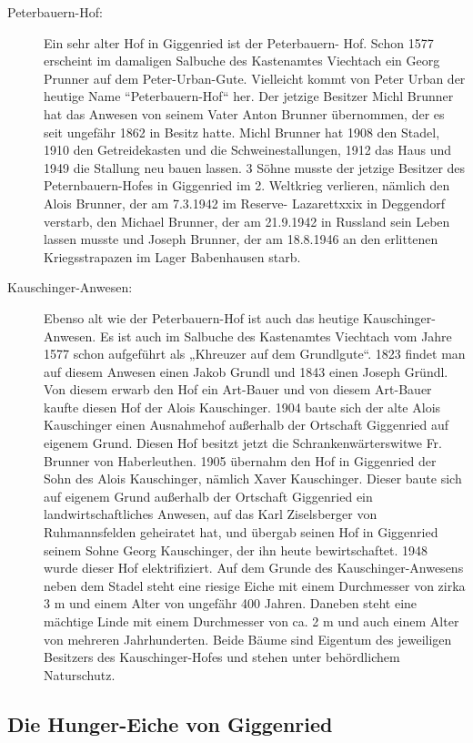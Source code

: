 \documentclass[12pt,a4pager]{book}
\begin{document}
\begin{description}
\item[Peterbauern-Hof:] Ein sehr alter Hof in Giggenried ist der Peterbauern-
Hof. Schon 1577 erscheint im damaligen Salbuche des Kastenamtes Viechtach ein
Georg Prunner auf dem Peter-Urban-Gute. Vielleicht kommt von Peter Urban der
heutige Name “Peterbauern-Hof“ her. Der jetzige Besitzer Michl Brunner hat das
Anwesen von seinem Vater Anton Brunner übernommen, der es seit ungefähr 1862 in
Besitz hatte. Michl Brunner hat 1908 den Stadel, 1910 den Getreidekasten und die
Schweinestallungen, 1912 das Haus und 1949 die Stallung neu bauen lassen. 3
Söhne musste der jetzige Besitzer des Peternbauern-Hofes in Giggenried im 2.
Weltkrieg verlieren, nämlich den Alois Brunner, der am 7.3.1942 im Reserve-
Lazarettxxix in Deggendorf verstarb, den Michael Brunner, der am 21.9.1942 in
Russland sein Leben lassen musste und Joseph Brunner, der am 18.8.1946 an den
erlittenen Kriegsstrapazen im Lager Babenhausen starb.

\item[Kauschinger-Anwesen:] Ebenso alt wie der Peterbauern-Hof ist auch das
heutige Kauschinger-Anwesen. Es ist auch im Salbuche des Kastenamtes Viechtach
vom Jahre 1577 schon aufgeführt als „Khreuzer auf dem Grundlgute“. 1823 findet
man auf diesem Anwesen einen Jakob Grundl und 1843 einen Joseph Gründl. Von
diesem erwarb den Hof ein Art-Bauer und von diesem Art-Bauer kaufte diesen Hof
der Alois Kauschinger. 1904 baute sich der alte Alois Kauschinger einen
Ausnahmehof außerhalb der Ortschaft Giggenried auf eigenem Grund. Diesen Hof
besitzt jetzt die Schrankenwärterswitwe Fr. Brunner von Haberleuthen. 1905
übernahm den Hof in Giggenried der Sohn des Alois Kauschinger, nämlich Xaver
Kauschinger. Dieser baute sich auf eigenem Grund außerhalb der Ortschaft
Giggenried ein landwirtschaftliches Anwesen, auf das Karl Ziselsberger von
Ruhmannsfelden geheiratet hat, und übergab seinen Hof in Giggenried seinem Sohne
Georg Kauschinger, der ihn heute bewirtschaftet. 1948 wurde dieser Hof
elektrifiziert. Auf dem Grunde des Kauschinger-Anwesens neben dem Stadel steht
eine riesige Eiche mit einem Durchmesser von zirka 3 m und einem Alter von
ungefähr 400 Jahren. Daneben steht eine mächtige Linde mit einem Durchmesser von
ca. 2 m und auch einem Alter von mehreren Jahrhunderten. Beide Bäume sind
Eigentum des jeweiligen Besitzers des Kauschinger-Hofes und stehen unter
behördlichem Naturschutz.
\end{description}

\subsection{Die Hunger-Eiche von Giggenried}
\end{document}
